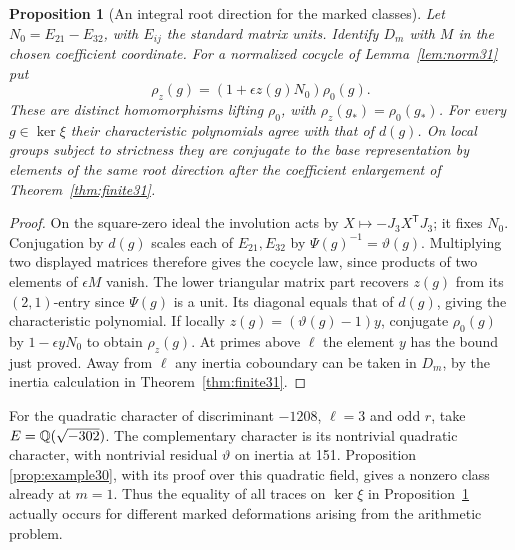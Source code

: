 \documentclass[a4paper,11pt]{article}
\newtheorem{proposition}{Proposition}[section]
\theoremstyle{definition}
\theoremstyle{remark}
\numberwithin{equation}{section}
\begin{document}
\begin{proposition}[An integral root direction for the marked classes]\label{prop:root31}
Let \(N_0=E_{21}-E_{32}\), with \(E_{ij}\) the standard matrix units. Identify \(D_m\) with \(M\) in the chosen coefficient coordinate. For a normalized cocycle of Lemma~\ref{lem:norm31} put
\[
       \rho_z(g)=(1+\epsilon z(g)N_0)\rho_0(g).
\]
These are distinct homomorphisms lifting \(\rho_0\), with \(\rho_z(g_*)=\rho_0(g_*)\). For every \(g\in\ker\xi\) their characteristic polynomials agree with that of \(d(g)\). On local groups subject to strictness they are conjugate to the base representation by elements of the same root direction after the coefficient enlargement of Theorem~\ref{thm:finite31}.
\end{proposition}
\begin{proof}
On the square-zero ideal the involution acts by \(X\mapsto-J_3X^{\mathsf T}J_3\); it fixes \(N_0\). Conjugation by \(d(g)\) scales each of \(E_{21},E_{32}\) by \(\Psi(g)^{-1}=\vartheta(g)\). Multiplying two displayed matrices therefore gives the cocycle law, since products of two elements of \(\epsilon M\) vanish. The lower triangular matrix part recovers \(z(g)\) from its \((2,1)\)-entry since \(\Psi(g)\) is a unit. Its diagonal equals that of \(d(g)\), giving the characteristic polynomial. If locally \(z(g)=(\vartheta(g)-1)y\), conjugate \(\rho_0(g)\) by \(1-\epsilon yN_0\) to obtain \(\rho_z(g)\). At primes above \(\ell\) the element \(y\) has the bound just proved. Away from \(\ell\) any inertia coboundary can be taken in \(D_m\), by the inertia calculation in Theorem~\ref{thm:finite31}.
\end{proof}

For the quadratic character of discriminant \(-1208\), \(\ell=3\) and odd \(r\), take \(E=\mathbb Q(\sqrt{-302})\). The complementary character is its nontrivial quadratic character, with nontrivial residual \(\vartheta\) on inertia at 151. Proposition \ref{prop:example30}, with its proof over this quadratic field, gives a nonzero class already at \(m=1\). Thus the equality of all traces on \(\ker\xi\) in Proposition~\ref{prop:root31} actually occurs for different marked deformations arising from the arithmetic problem.
\end{document}
